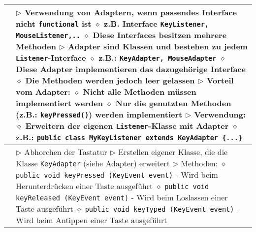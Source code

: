 \begin{longtable}{ | p{} p{} | }
	\makecell[l]{Adapter} & \makecell[l]{
	$\rhd$ Verwendung von Adaptern, wenn passendes Interface nicht \texttt{functional} ist \\
	\hspace{0.4cm} $\diamond$ z.B. Interface \texttt{KeyListener, MouseListener,..} \\
	\hspace{0.4cm} $\diamond$ Diese Interfaces besitzen mehrere Methoden \\
	$\rhd$ Adapter sind Klassen und bestehen zu jedem \texttt{Listener}-Interface \\
	\hspace{0.4cm} $\diamond$ z.B.: \texttt{KeyAdapter, MouseAdapter} \\
	\hspace{0.4cm} $\diamond$ Diese Adapter implementieren das dazugehörige Interface \\
	\hspace{0.4cm} $\diamond$ Die Methoden werden jedoch leer gelassen \\
	$\rhd$ Vorteil vom Adapter: \\
	\hspace{0.4cm} $\diamond$ Nicht alle Methoden müssen implementiert werden \\
	\hspace{0.4cm} $\diamond$ Nur die genutzten Methoden (z.B.: \texttt{keyPressed()}) werden implementiert \\
	$\rhd$ Verwendung: \\
	\hspace{0.4cm} $\diamond$ Erweitern der eigenen \texttt{Listener}-Klasse mit Adapter \\
	\hspace{0.4cm} $\diamond$ z.B.: \texttt{public class MyKeyListener extends KeyAdapter \{...\}}} \\ \hline

	\makecell[l]{Interface KeyListener} & \makecell[l]{
	$\rhd$ Abhorchen der Tastatur \\
	$\rhd$ Erstellen eigener Klasse, die die Klasse \texttt{KeyAdapter} (siehe Adapter) erweitert \\
	$\rhd$ Methoden: \\
	\hspace{0.4cm} $\diamond$ \texttt{public void keyPressed (KeyEvent event)} \\
	\hspace{0.6cm} - Wird beim Herunterdrücken einer Taste ausgeführt \\
	\hspace{0.4cm} $\diamond$ \texttt{public void keyReleased (KeyEvent event)} \\
	\hspace{0.6cm} - Wird beim Loslassen einer Taste ausgeführt \\
	\hspace{0.4cm} $\diamond$ \texttt{public void keyTyped (KeyEvent event)} \\
	\hspace{0.6cm} - Wird beim Antippen einer Taste ausgeführt} \\ \hline


\end{longtable}
